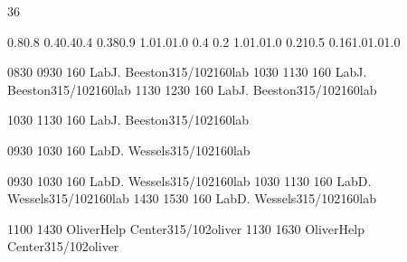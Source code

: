 \documentclass[10pt]{report}
\begin{document}
\thispagestyle{empty}
\begin{landscape}
\noindent{}

\setslotsize{4cm}{0.42cm}
 {36}
\settextframe{3mm}

\settimestyle{\small}

 {0.8}{0.8} {0.4}{0.4}{0.4}
 {0.38}{0.9} {1.0}{1.0}{1.0}
 {0.4} {0.2} {1.0}{1.0}{1.0}
 {0.21}{0.5} {0.16}{1.0}{1.0}{1.0}

\begin{timetable}


   {0830} {0930} {160 Lab}{J. Beeston}{315/102}{160lab}
   {1030} {1130} {160 Lab}{J. Beeston}{315/102}{160lab}
   {1130} {1230} {160 Lab}{J. Beeston}{315/102}{160lab}

   {1030} {1130} {160 Lab}{J. Beeston}{315/102}{160lab}

   {0930} {1030} {160 Lab}{D. Wessels}{315/102}{160lab}

   {0930} {1030} {160 Lab}{D. Wessels}{315/102}{160lab}
   {1030} {1130} {160 Lab}{D. Wessels}{315/102}{160lab}
   {1430} {1530} {160 Lab}{D. Wessels}{315/102}{160lab}


   {1100} {1430} {Oliver}{Help Center}{315/102}{oliver}
   {1130} {1630} {Oliver}{Help Center}{315/102}{oliver}

\end{timetable}
\end{landscape}
\end{document}
